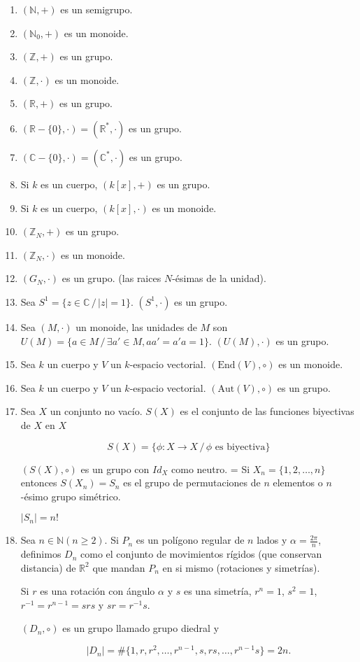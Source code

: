 \documentclass{article}
\theoremstyle{definition}
\begin{document}
\begin{enumerate}
\item $(\mathbb{N},+)$ es un semigrupo.
\item $(\mathbb{N}_0,+)$ es un monoide.
\item $(\mathbb{Z},+)$ es un grupo.
\item $(\mathbb{Z},\cdot)$ es un monoide.
\item $(\mathbb{R},+)$ es un grupo.
\item $(\mathbb{R} - \{0\},\cdot) = (\mathbb{R}^{*},\cdot)$ es un grupo.
\item $(\mathbb{C} - \{0\},\cdot) = (\mathbb{C}^{*},\cdot)$ es un grupo.
\item Si $k$ es un cuerpo, $(k[x],+)$ es un grupo.
\item Si $k$ es un cuerpo, $(k[x],\cdot)$ es un monoide.
\item $(\mathbb{Z}_N, +)$ es un grupo.
\item $(\mathbb{Z}_N,\cdot)$ es un monoide.
\item $(G_N,\cdot)$ es un grupo. (las raices $N$-\'esimas de la unidad).
\item Sea $S^1 = \{z \in \mathbb{C} \, / \, |z| = 1\}$. $(S^1,\cdot)$ es un grupo.
\item Sea $(M,\cdot)$ un monoide, las unidades de $M$ son $U(M) = \{a \in M \, / \, \exists a' \in M, aa' = a'a = 1\}$. $(U(M),\cdot)$ es un grupo.
\item Sea $k$ un cuerpo y $V$ un $k$-espacio vectorial. $(\textrm{End}(V),\circ)$ es un monoide.
\item Sea $k$ un cuerpo y $V$ un $k$-espacio vectorial. $(\textrm{Aut}(V),\circ)$ es un grupo.
\item Sea $X$ un conjunto no vac\'io. $S(X)$ es el conjunto de las funciones biyectivas de $X$ en $X$

$$S(X) = \{\phi : X \rightarrow X \, / \, \phi \textrm{ es biyectiva}\}$$

$(S(X),\circ)$ es un grupo con $Id_X$ como neutro.
=
Si $X_n = \{1,2,\dots,n\}$ entonces $S(X_n) = S_n$ es el grupo de permutaciones de $n$ elementos o $n$-\'esimo grupo sim\'etrico.

$|S_n| = n!$

\item Sea $n \in \mathbb{N} (n \geq 2)$. Si $P_n$ es un pol\'igono regular de $n$ lados y $\alpha = \frac{2\pi}{n}$, definimos $D_n$ como el conjunto de movimientos r\'igidos (que conservan distancia) de $\mathbb{R}^2$ que mandan $P_n$ en si mismo (rotaciones y simetr\'ias).

Si $r$ es una rotaci\'on con \'angulo $\alpha$ y $s$ es una simetr\'ia, $r^n = 1$, $s^2 = 1$, $r^{-1} = r^{n-1} = srs$ y $sr = r^{-1}s$.

$(D_n,\circ)$ es un grupo llamado grupo diedral y 

$$|D_n| = \#\{1,r,r^2,\dots,r^{n-1},s,rs,\dots,r^{n-1}s\} = 2n.$$
\end{enumerate}
\end{document}
